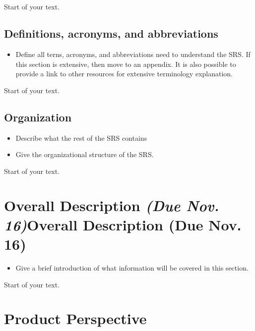 \documentclass[12pt]{article}
\begin{document}
\subsection*{}\label{section}

Start of your text.

\subsection{Definitions, acronyms, and
abbreviations}\label{definitions-acronyms-and-abbreviations}

\begin{itemize}
\item
  Define all terns, acronyms, and abbreviations need to understand the
  SRS. If this section is extensive, then move to an appendix. It is
  also possible to provide a link to other resources for extensive
  terminology explanation.
\end{itemize}

Start of your text.

\subsection{Organization}\label{organization}

\begin{itemize}
\item
  Describe what the rest of the SRS contains
\item
  Give the organizational structure of the SRS.
\end{itemize}

Start of your text.

\section{{Overall Description \emph{(Due Nov.
16)}}{Overall Description (Due Nov. 16)}}\label{overall-description-due-nov.-16}

\begin{itemize}
\item
  Give a brief introduction of what information will be covered in this
  section.
\end{itemize}

Start of your text.

\section{Product Perspective}\label{product-perspective}
\end{document}
